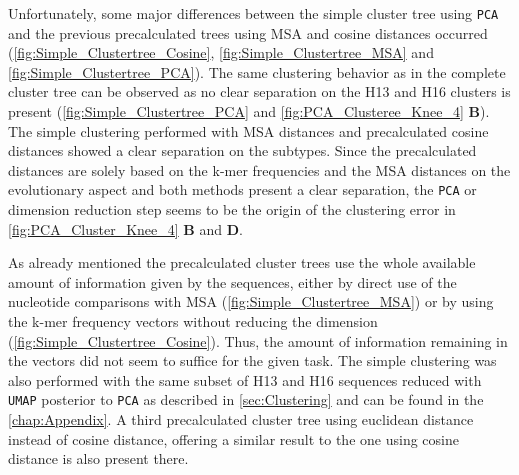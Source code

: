 Unfortunately, some major differences between the simple cluster tree using \texttt{PCA} and the previous precalculated trees using \gls{MSA} and cosine distances occurred (\autoref{fig:Simple_Clustertree_Cosine}, \autoref{fig:Simple_Clustertree_MSA} and \autoref{fig:Simple_Clustertree_PCA}). The same clustering behavior as in the complete cluster tree can be observed as no clear separation on the H13 and H16 clusters is present (\autoref{fig:Simple_Clustertree_PCA} and \autoref{fig:PCA_Clusteree_Knee_4} \textbf{\textsf{B}}). The simple clustering performed with \gls{MSA} distances and precalculated cosine distances showed a clear separation on the subtypes. Since the precalculated distances are solely based on the k-mer frequencies and the \gls{MSA} distances on the evolutionary aspect and both methods present a clear separation, the \texttt{PCA} or dimension reduction step seems to be the origin of the clustering error in \autoref{fig:PCA_Cluster_Knee_4} \textbf{\textsf{B}} and \textbf{\textsf{D}}. 

\vspace{1em}

As already mentioned the precalculated cluster trees use the whole available amount of information given by the sequences, either by direct use of the nucleotide comparisons with \gls{MSA} (\autoref{fig:Simple_Clustertree_MSA}) or by using the k-mer frequency vectors without reducing the dimension (\autoref{fig:Simple_Clustertree_Cosine}). Thus, the amount of information remaining in the vectors did not seem to suffice for the given task. The simple clustering was also performed with the same subset of H13 and H16 sequences reduced with \texttt{UMAP} posterior to \texttt{PCA} as described in \autoref{sec:Clustering} and can be found in the \autoref{chap:Appendix}. A third precalculated cluster tree using euclidean distance instead of cosine distance, offering a similar result to the one using cosine distance is also present there.